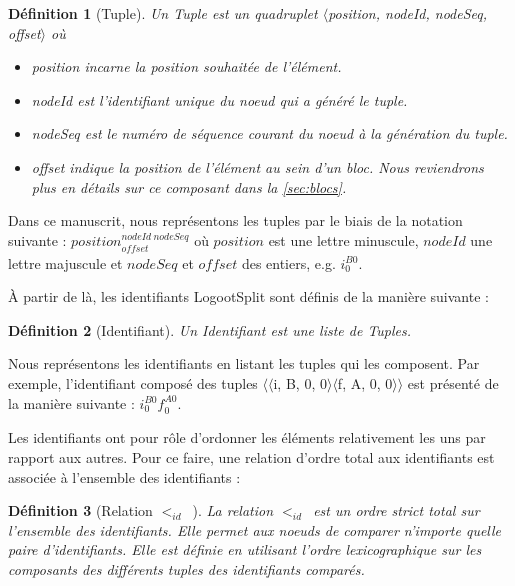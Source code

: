 \documentclass[12pt]{thesul}
\newtheorem{definition}{Définition}
\newcommand{\eg}{e.g. }
\newcommand{\trm}[1]{\mathit{#1}}
\newcommand{\id}[3]{$\trm{#1}^{\trm{#2}}_{\trm{#3}}$}
\newcommand{\lid}{$<_{id}$~}
\begin{document}
\begin{definition}[Tuple]
  Un \emph{Tuple} est un quadruplet $\langle$position, nodeId, nodeSeq, offset$\rangle$ où
  \begin{itemize}
    \item position incarne la position souhaitée de l'élément.
    \item nodeId est l'identifiant unique du noeud qui a généré le tuple.
    \item nodeSeq est le numéro de séquence courant du noeud à la génération du tuple.
    \item offset indique la position de l'élément au sein d'un bloc. Nous reviendrons plus en détails sur ce composant dans la \autoref{sec:blocs}.
  \end{itemize}
\end{definition}


Dans ce manuscrit, nous représentons les tuples par le biais de la notation suivante : \id{position}{nodeId~nodeSeq}{offset} où $\trm{position}$ est une lettre minuscule, $\trm{nodeId}$ une lettre majuscule et $\trm{nodeSeq}$ et $\trm{offset}$ des entiers, \eg \id{i}{B0}{0}.

À partir de là, les identifiants LogootSplit sont définis de la manière suivante :

\begin{definition}[Identifiant]
  Un \emph{Identifiant} est une liste de \emph{Tuples}.
\end{definition}


Nous représentons les identifiants en listant les tuples qui les composent.
Par exemple, l'identifiant composé des tuples $\langle\langle$i, B, 0, 0$\rangle\langle$f, A, 0, 0$\rangle\rangle$ est présenté de la manière suivante : \id{i}{B0}{0}\id{f}{A0}{0}.

Les identifiants ont pour rôle d'ordonner les éléments relativement les uns par rapport aux autres.
Pour ce faire, une relation d'ordre total aux identifiants est associée à l'ensemble des identifiants :

\begin{definition}[Relation \lid]
  La relation \lid est un ordre strict total sur l'ensemble des identifiants.
  Elle permet aux noeuds de comparer n'importe quelle paire d'identifiants.
  Elle est définie en utilisant l'ordre lexicographique sur les composants des différents tuples des identifiants comparés.
\end{definition}
\end{document}
